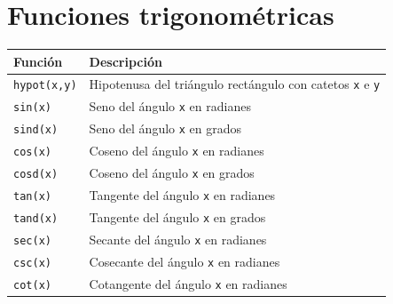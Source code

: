 \documentclass[
  a4paper,
]{scrreport}
\theoremstyle{definition}
\theoremstyle{remark}
\begin{document}
\section{Funciones trigonométricas}\label{funciones-trigonomuxe9tricas}

\begin{longtable}[]{@{}
  >{\raggedright\arraybackslash}p{}
  >{\raggedright\arraybackslash}p{}@{}}
\toprule\noalign{}
\begin{minipage}[b]{\linewidth}\raggedright
Función
\end{minipage} & \begin{minipage}[b]{\linewidth}\raggedright
Descripción
\end{minipage} \\
\midrule\noalign{}
\endhead
\bottomrule\noalign{}
\endlastfoot
\texttt{hypot(x,y)} & Hipotenusa del triángulo rectángulo con catetos
\texttt{x} e \texttt{y} \\
\texttt{sin(x)} & Seno del ángulo \texttt{x} en radianes \\
\texttt{sind(x)} & Seno del ángulo \texttt{x} en grados \\
\texttt{cos(x)} & Coseno del ángulo \texttt{x} en radianes \\
\texttt{cosd(x)} & Coseno del ángulo \texttt{x} en grados \\
\texttt{tan(x)} & Tangente del ángulo \texttt{x} en radianes \\
\texttt{tand(x)} & Tangente del ángulo \texttt{x} en grados \\
\texttt{sec(x)} & Secante del ángulo \texttt{x} en radianes \\
\texttt{csc(x)} & Cosecante del ángulo \texttt{x} en radianes \\
\texttt{cot(x)} & Cotangente del ángulo \texttt{x} en radianes \\
\end{longtable}
\end{document}
